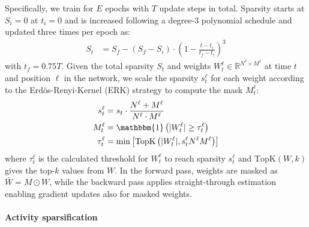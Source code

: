 Specifically, we train for $E$ epochs with $T$ update steps in total. Sparsity starts at $S_i=0$ at $t_i=0$ and is increased following a degree-3 polynomial schedule \cite{DBLP:conf/iclr/ZhuG18} and updated three times per epoch as:
\begin{align*}
S_t &= S_f - (S_f - S_i) \cdot \left( 1 - \frac{t - t_i}{t_f-t_i} \right)^3 %
\end{align*}
with $t_f=0.75 T$.
%
Given the total sparsity $S_t$ and weights $W_t^\ell \in \mathbb{R}^{N^\ell \times M^\ell}$ at time $t$ and position $\ell$ in the network, we scale the sparsity $s^\ell_t$ for each weight according to the Erdös-Renyi-Kernel (ERK) strategy \cite{evci_rigging_2020,mocanu_scalable_2018} to compute the mask $M_t^\ell$:
\begin{align*}
s_t^\ell &= s_t \cdot \frac{N^\ell + M^\ell}{N^\ell \cdot M^\ell} \\
M_t^\ell &= \mathbbm{1} \left( |W_t^\ell| \geq \tau_t^\ell \right) \\
\tau_t^\ell &= \min \left[ \text{TopK} \left( |W_t^\ell|, s_t^\ell N^\ell M^\ell \right) \right]
\end{align*}
where $\tau_t^\ell$ is the calculated threshold for $W_t^\ell$ to reach sparsity $s_t^\ell$ and $\text{TopK}(W, k)$ gives the top-$k$ values from $W$.
In the forward pass, weights are masked as $\bar{W}=M\odot W$, while the backward pass applies straight-through estimation \cite{DBLP:journals/corr/BengioLC13} enabling gradient updates also for masked weights. 

\paragraph{Activity sparsification}

